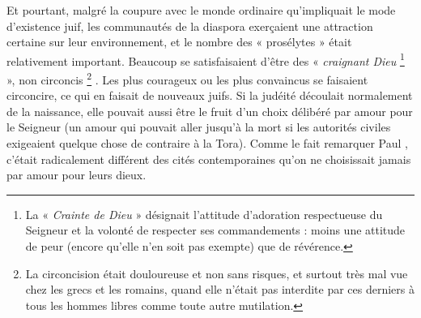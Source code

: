  Et pourtant, malgré la coupure avec le monde ordinaire qu'impliquait le mode d'existence juif, les communautés de la diaspora exerçaient une attraction certaine sur leur environnement, et le nombre des « prosélytes » était relativement important. Beaucoup se satisfaisaient d'être des « \emph{craignant Dieu}%
\footnote{La « \emph{Crainte de Dieu} » désignait l'attitude d'adoration respectueuse du Seigneur et la volonté de respecter ses commandements : moins une attitude de peur (encore qu'elle n'en soit pas exempte) que de révérence.}%
 », non circoncis%
\footnote{La circoncision était douloureuse et non sans risques, et surtout très mal vue chez les grecs et les romains, quand elle n'était pas interdite par ces derniers à tous les hommes libres comme toute autre mutilation.}%
. Les plus courageux ou les plus convaincus se faisaient circoncire, ce qui en faisait de nouveaux juifs. Si la judéité découlait normalement de la naissance, elle pouvait aussi être le fruit d'un choix délibéré par amour pour le Seigneur (un amour qui pouvait aller jusqu'à la mort si les autorités civiles exigeaient quelque chose de contraire à la Tora). Comme le fait remarquer Paul , c'était radicalement différent des cités contemporaines qu'on ne choisissait jamais par amour pour leurs dieux.

